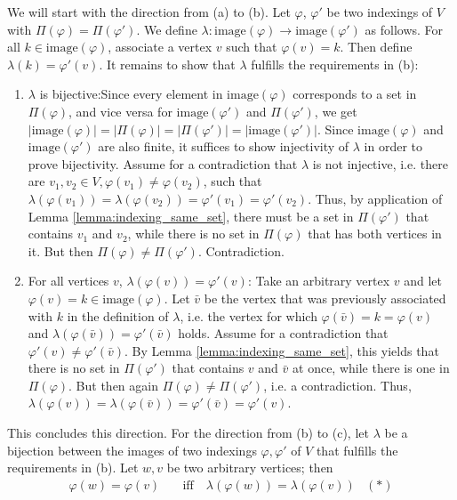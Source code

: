 \documentclass[11pt,a4paper]{article}
\numberwithin{equation}{section}
\newcommand{\idx}{\varphi}
\newcommand{\image}{\mathrm{image}}
\begin{document}
\begin{appendixproof}
    We will start with the direction from (a) to (b). Let $\idx$, $\idx'$ be two indexings of $V$ with $\Pi(\idx) = \Pi(\idx')$. We define $\lambda : \image(\idx)\rightarrow \image(\idx')$ as follows. For all $k \in \image(\idx)$, associate a vertex $v$ such that $\idx(v)=k$. Then define $\lambda(k)=\idx'(v)$. It remains to show that $\lambda$ fulfills the requirements in (b):
    \begin{enumerate}
        \item $\lambda$ is bijective:\quad Since every element in $\image(\idx)$ corresponds to a set in $\Pi(\idx)$, and vice versa for $\image(\idx')$ and $\Pi(\idx')$, we get $|\image(\idx)|=|\Pi(\idx)|=|\Pi(\idx')|=|\image(\idx')|$. Since $\image(\idx)$ and $\image(\idx')$ are also finite, it suffices to show injectivity of $\lambda$ in order to prove bijectivity. Assume for a contradiction that $\lambda$ is not injective, i.e. there are $v_1,v_2 \in V, \idx(v_1) \neq \idx(v_2)$, such that $\lambda(\idx(v_1))=\lambda(\idx(v_2))=\idx'(v_1)=\idx'(v_2)$. Thus, by application of Lemma \ref{lemma:indexing_same_set}, there must be a set in $\Pi(\idx')$ that contains $v_1$ and $v_2$, while there is no set in $\Pi(\idx)$ that has both vertices in it. But then $\Pi(\idx)\neq \Pi(\idx')$. Contradiction.
        \item For all vertices $v$, $\lambda(\idx(v)) = \idx'(v)$: \quad Take an arbitrary vertex $v$ and let $\idx(v) = k \in \image(\idx)$. Let $\bar{v}$ be the vertex that was previously associated with $k$ in the definition of $\lambda$, i.e. the vertex for which $\idx(\bar{v})=k = \idx(v)$ and $\lambda(\idx(\bar{v}))=\idx'(\bar{v})$ holds. Assume for a contradiction that $\idx'(v)\neq \idx'(\bar{v})$. By Lemma \ref{lemma:indexing_same_set}, this yields that there is no set in $\Pi(\idx')$ that contains $v$ and $\bar{v}$ at once, while there is one in $\Pi(\idx)$. But then again $\Pi(\idx) \neq \Pi(\idx')$, i.e. a contradiction. Thus, $\lambda(\idx(v)) = \lambda(\idx(\bar{v})) = \idx'(\bar{v}) = \idx'(v)$. 
    \end{enumerate}
    This concludes this direction. For the direction from (b) to (c), let $\lambda$ be a bijection between the images of two indexings $\idx, \idx'$ of $V$ that fulfills the requirements in (b). Let $w,v$ be two arbitrary vertices; then
    \begin{align*}
        \idx(w) = \idx(v) &\quad\text{iff}\quad \lambda(\idx(w)) = \lambda(\idx(v)) &(*) \\ 

\end{align*}
\end{appendixproof}
\end{document}
